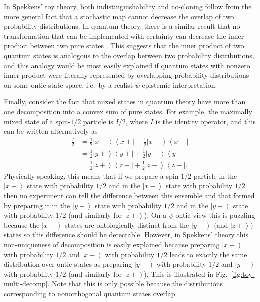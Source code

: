 \documentclass[DIV=calc,fontsize=12pt]{scrartcl} %
\theoremstyle{definition}
\theoremstyle{plain}
\newcommand{\RKet}[1]{\ensuremath{\left \vert #1 \right )}}
\newcommand{\Ket}[1]{\ensuremath{\left \vert #1 \right \rangle}}
\newcommand{\Bra}[1]{\ensuremath{\left \langle #1 \right \vert}}
\begin{document}
In Spekkens' toy theory, both indistinguishability and no-cloning
follow from the more general fact that a stochastic map cannot
decrease the overlap of two probability distributions. In quantum
theory, there is a similar result that no transformation that can be
implemented with certainty can decrease the inner product between two
pure states \cite{Chefles1998}.  This suggests that the inner product
of two quantum states is analogous to the overlap between two
probability distributions, and this analogy would be most easily
explained if quantum states with nonzero inner product were literally
represented by overlapping probability distributions on some ontic
state space, i.e.\ by a realist $\psi$-epistemic interpretation.

Finally, consider the fact that mixed states in quantum theory have
more than one decomposition into a convex sum of pure states.  For
example, the maximally mixed state of a spin-$1/2$ particle is $I/2$,
where $I$ is the identity operator, and this can be written
alternatively as
\begin{align}
\frac{I}{2} & = \frac{1}{2} \Ket{x+}\Bra{x+} + \frac{1}{2}
\Ket{x-}\Bra{x-} \\
& = \frac{1}{2} \Ket{y+}\Bra{y+} + \frac{1}{2} \Ket{y-}\Bra{y-} \\
& = \frac{1}{2} \Ket{z+}\Bra{z+} + \frac{1}{2} \Ket{z-}\Bra{z-}.
\end{align}
Physically speaking, this means that if we prepare a spin-$1/2$
particle in the $\Ket{x+}$ state with probability $1/2$ and in the
$\Ket{x-}$ state with probability $1/2$ then no experiment can tell
the difference between this ensemble and that formed by preparing it
in the $\Ket{y+}$ state with probability $1/2$ and in the $\Ket{y-}$
state with probability $1/2$ (and similarly for $\Ket{z \pm}$).  On a
$\psi$-ontic view this is puzzling because the $\Ket{x \pm}$ states
are ontologically distinct from the $\Ket{y \pm}$ (and $\Ket{z \pm}$)
states so this difference should be detectable.  However, in Spekkens'
theory this non-uniqueness of decomposition is easily explained because
preparing $\RKet{x+}$ with probability $1/2$ and $\RKet{x-}$ with
probability $1/2$ leads to exactly the same distribution over ontic
states as preparing $\RKet{y+}$ with probability $1/2$ and $\RKet{y-}$
with probability $1/2$ (and similarly for $\RKet{z \pm}$).  This is
illustrated in Fig.~\ref{fig:toy-multi-decomp}.  Note that this is
only possible because the distributions corresponding to nonorthogonal
quantum states overlap.
\end{document}

